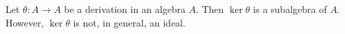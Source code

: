 Let $\theta: A \to A$ be a derivation in an algebra $A$. Then $\ker \theta$ is a subalgebra of $A$. However, $\ker \theta$ is not, in general, an ideal.
